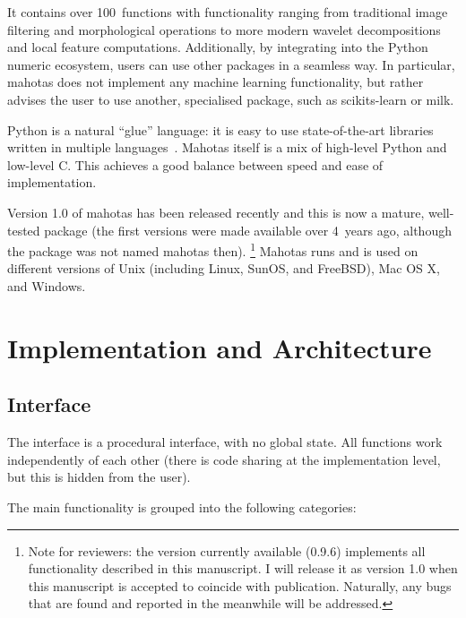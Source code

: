 \documentclass{scrartcl}
\newcommand*{\cpp}{{C\nolinebreak[4]\hspace{-.05em}\raisebox{.4ex}{\tiny\textbf{++}}}}
\begin{document}
It contains over 100~functions with functionality ranging from traditional
image filtering and morphological operations to more modern wavelet
decompositions and local feature computations. Additionally, by integrating
into the Python numeric ecosystem, users can use other packages in a seamless
way. In particular, mahotas does not implement any machine learning
functionality, but rather advises the user to use another, specialised package,
such as scikits-learn or milk.

Python is a natural ``glue'' language: it is easy to use state-of-the-art
libraries written in multiple languages~\citep{10.1109/MCSE.2007.58}. Mahotas
itself is a mix of high-level Python and low-level \cpp{}. This achieves a good
balance between speed and ease of implementation.

Version 1.0 of mahotas has been released recently and this is now a mature,
well-tested package (the first versions were made available over 4~years ago,
although the package was not named mahotas then). \footnote{Note for reviewers:
the version currently available (0.9.6) implements all functionality described
in this manuscript. I will release it as version 1.0 when this manuscript is
accepted to coincide with publication. Naturally, any bugs that are found and
reported in the meanwhile will be addressed.} Mahotas runs and is used on
different versions of Unix (including Linux, SunOS, and FreeBSD), Mac OS X, and
Windows.

\section{Implementation and Architecture}

\subsection{Interface}

The interface is a procedural interface, with no global state. All functions
work independently of each other (there is code sharing at the implementation
level, but this is hidden from the user).

The main functionality is grouped into the following categories:
\end{document}
